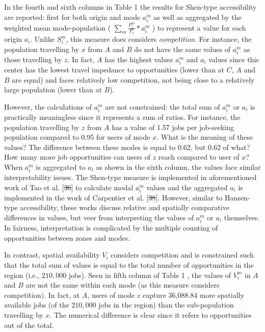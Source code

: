 \documentclass[10pt,letterpaper]{article}
\providecommand{\DIFaddtex}[1]{{\protect\color{blue}\uwave{#1}}} %
\providecommand{\DIFdeltex}[1]{{\protect\color{red}\sout{#1}}}                      %
\providecommand{\DIFaddbegin}{} %
\providecommand{\DIFaddend}{} %
\providecommand{\DIFdelbegin}{} %
\providecommand{\DIFdelend}{} %
\providecommand{\DIFadd}[1]{\texorpdfstring{\DIFaddtex{#1}}{#1}} %
\providecommand{\DIFdel}[1]{\texorpdfstring{\DIFdeltex{#1}}{}} %
\newcommand{\DIFscaledelfig}{0.5}
\newlength{\DIFdelgraphicswidth} %
\newlength{\DIFdelgraphicsheight} %
\newcommand{\DIFaddincludegraphics}[2][]{{\color{blue}\fbox{\DIFOincludegraphics[#1]{#2}}}} %
\newcommand{\DIFdelincludegraphics}[2][]{%
\sbox{\DIFdelgraphicsbox}{\DIFOincludegraphics[#1]{#2}}%
\settoboxwidth{\DIFdelgraphicswidth}{\DIFdelgraphicsbox} %
\settoboxtotalheight{\DIFdelgraphicsheight}{\DIFdelgraphicsbox} %
\scalebox{\DIFscaledelfig}{%
\parbox[b]{\DIFdelgraphicswidth}{\usebox{\DIFdelgraphicsbox}\\[-\baselineskip] \rule{\DIFdelgraphicswidth}{0em}}\llap{\resizebox{\DIFdelgraphicswidth}{\DIFdelgraphicsheight}{%
\setlength{\unitlength}{\DIFdelgraphicswidth}%
\begin{picture}(1,1)%
\thicklines\linethickness{2pt} %
{\color[rgb]{1,0,0}\put(0,0){\framebox(1,1){}}}%
{\color[rgb]{1,0,0}\put(0,0){\line( 1,1){1}}}%
{\color[rgb]{1,0,0}\put(0,1){\line(1,-1){1}}}%
\end{picture}%
}\hspace*{3pt}}} %
} %
\DeclareRobustCommand{\DIFaddbegin}{\DIFOaddbegin \let\includegraphics\DIFaddincludegraphics} %
\DeclareRobustCommand{\DIFaddend}{\DIFOaddend \let\includegraphics\DIFOincludegraphics} %
\DeclareRobustCommand{\DIFdelbegin}{\DIFOdelbegin \let\includegraphics\DIFdelincludegraphics} %
\DeclareRobustCommand{\DIFdelend}{\DIFOaddend \let\includegraphics\DIFOincludegraphics} %
\begin{document}
In the fourth and sixth columns in Table 1 the results for Shen-type
accessibility are reported: first for both origin and mode \(a_i^m\) as
well as aggregated by the weighted mean mode-population (
\(\sum_m \frac{P_i^m}{P_i}*a_i^m\) ) to represent a value for each
origin \(a_i\). Unlike \(S_i^m\), this measure does considers
\emph{competition}. For instance, the population travelling by \(x\)
from \(A\) and \(B\) do not have the same values of \(a_i^m\) as those
travelling by \(z\). In fact, \(A\) has the highest values \(a_i^m\) and
\(a_i\) values since this center has the lowest travel impedance to
opportunities (lower than at \(C\), \(A\) and \(B\) are equal) and faces
relatively low competition, not being close to a relatively large
population (lower than at \(B\)).

However, the calculations of \(a_i^m\) are not constrained: the total
sum of \(a_i^m\) or \(a_i\) is practically meaningless since it
represents a sum of ratios. For instance, the population travelling by
\(z\) from \(A\) has a value of 1.57 jobs per job-seeking population
compared to 0.95 for users of mode \(x\). What is the meaning of these
values? The difference between these modes is equal to 0.62, but 0.62 of
what? How many more job opportunities can users of \(z\) reach compared
to user of \(x\)? When \(a_i^m\) is aggregated to \(a_i\) as shown in
the sixth column, the values face similar interpretability issues. The
Shen-type measure is implemented in aforementioned work of Tao et al.
{[}\DIFdelbegin \DIFdel{36}\DIFdelend \DIFaddbegin \DIFadd{47}\DIFaddend {]} to calculate modal \(a_i^m\) values and the aggregated \(a_i\)
is implemented in the work of Carpentier et al. {[}\DIFdelbegin \DIFdel{38}\DIFdelend \DIFaddbegin \DIFadd{49}\DIFaddend {]}. However,
similar to Hansen-type accessibility, these works discuss relative and
spatially comparative differences in values, but veer from interpreting
the values of \(a_i^m\) or \(a_i\) themselves. In fairness,
interpretation is complicated by the multiple counting of opportunities
between zones and modes.

In contrast, spatial availability \(V_i\) considers competition and is
constrained such that the total sum of values is equal to the total
number of opportunities in the region (i.e., \(210,000\) jobs). Seen in
fifth column of Table 1 , the values of \(V_i^m\) in \(A\) and \(B\) are
not the same within each mode (as this measure considers competition).
In fact, at \(A\), users of mode \(z\) capture 36,088.84 more spatially
available jobs (of the \(210,000\) jobs in the region) than the
sub-population travelling by \(x\). The numerical difference is clear
since it refers to opportunities out of the total.
\end{document}

